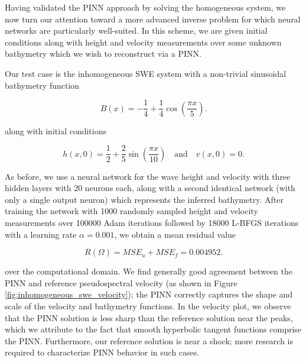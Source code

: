 Having validated the PINN approach by solving the homogeneous system, we now turn our attention toward a more advanced
inverse problem for which neural networks are particularly well-suited. In this scheme, we are given initial conditions 
along with height and velocity measurements over some unknown bathymetry which we wish to reconstruct via a PINN. 

Our test case is the inhomogeneous SWE system with a non-trivial sinusoidal bathymetry function

$$
B(x) = -\frac{1}{4} + \frac{1}{4} \cos{\left( \frac{\pi x}{5} \right)}.
$$

\noindent along with initial conditions

$$
h(x, 0) = \frac{1}{2} + \frac{2}{5} \sin{\left( \frac{\pi x}{10} \right)} \quad \text{and} \quad v(x, 0) = 0.
$$

As before, we use a neural network for the wave height and velocity with three hidden layers with 20 neurons each, along
with a second identical network (with only a single output neuron) which represents the inferred bathymetry. After 
training the network with 1000 randomly sampled height and velocity measurements over 100000 Adam iterations followed by
18000 L-BFGS iterations with a learning rate $\alpha = 0.001$, we obtain a mean residual value

$$
R(\Omega) = MSE_u + MSE_f = 0.004952.
$$

\noindent over the computational domain. We find generally good agreement between the PINN and reference pseudospectral 
velocity (as shown in Figure \ref*{fig:inhomogeneous_swe_velocity}); the PINN correctly captures the shape and scale of 
the velocity and bathymetry functions. In the velocity plot, we observe that the PINN solution is less sharp than the 
reference solution near the peaks, which we attribute to the fact that smooth hyperbolic tangent functions comprise the 
PINN. Furthermore, our reference solution is near a shock; more research is required to characterize PINN behavior in 
such cases.


